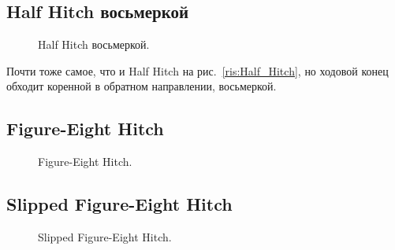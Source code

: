 \subsection{Half Hitch восьмеркой}

\begin{figure}[H]\centering
	\begin{minipage}{1\linewidth}
		\begin{center}
			\tcbox[enhanced jigsaw,colframe=black,opacityframe=0.5,opacityback=0.5]
			{\centering{}}
		\end{center}
	\end{minipage}
\caption{Half Hitch восьмеркой.}
\label{ris:Half_Hitch_8}
\end{figure}

Почти тоже самое, что и Half Hitch на рис.~\ref{ris:Half_Hitch}, но ходовой конец обходит коренной в обратном направлении, восьмеркой.

\subsection{Figure-Eight Hitch}

\begin{figure}[H]\centering
	\begin{minipage}{1\linewidth}
		\begin{center}
			\tcbox[enhanced jigsaw,colframe=black,opacityframe=0.5,opacityback=0.5]
			{\centering{}}
		\end{center}
	\end{minipage}
\caption{Figure-Eight Hitch.}
\label{ris:Figure-Eight_Hitch}
\end{figure}

\subsection{Slipped Figure-Eight Hitch}

\begin{figure}[H]\centering
	\begin{minipage}{1\linewidth}
		\begin{center}
			\tcbox[enhanced jigsaw,colframe=black,opacityframe=0.5,opacityback=0.5]
			{\centering{}}
		\end{center}
	\end{minipage}
\caption{Slipped Figure-Eight Hitch.}
\label{ris:Slipped_Figure-Eight_Hitch}
\end{figure}

